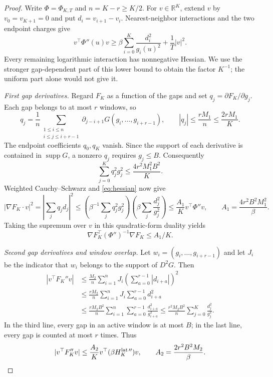 \documentclass[11pt,reqno]{amsart}
\numberwithin{equation}{section}
\theoremstyle{definition}
\theoremstyle{remark}
\newcommand{\R}{\mathbb R}
\newcommand{\1}{\mathbf 1}
\newcommand{\abs}[1]{\left\lvert #1\right\rvert}
\DeclareMathOperator{\supp}{supp}
\begin{document}
\begin{proof}
Write $\Phi=\Phi_{K,T}$ and $n=K-r\ge K/2$. For $v\in\R^K$,
extend $v$ by $v_0=v_{K+1}=0$ and put $d_i=v_{i+1}-v_i$.
Nearest-neighbor interactions and the two endpoint charges give
\begin{equation}\label{eq:hessian}
v^\top\Phi''(u)v
\ge\beta\sum_{i=0}^K\frac{d_i^2}{g_i(u)^2}
   +\frac1T|v|^2.
\end{equation}
Every remaining logarithmic interaction has nonnegative Hessian.
We use the stronger gap-dependent part of this lower bound to obtain
the factor $K^{-1}$; the uniform part alone would not give it.

\smallskip\noindent\textit{First gap derivatives.}
Regard $F_K$ as a function of the gaps and set
$q_j=\partial F_K/\partial g_j$. Each gap belongs to at most $r$
windows, so
\[
q_j=\frac1n\sum_{\substack{1\le i\le n\\i\le j\le i+r-1}}
  \partial_{j-i+1}G(g_i,\ldots,g_{i+r-1}),\qquad
|q_j|\le\frac{rM_1}{n}\le\frac{2rM_1}{K}.
\]
The endpoint coefficients $q_0,q_K$ vanish. Since the support of
each derivative is contained in $\supp G$, a nonzero $q_j$ requires
$g_j\le B$. Consequently
\[
\sum_{j=0}^K q_j^2g_j^2\le\frac{4r^2M_1^2B^2}{K}.
\]
Weighted Cauchy--Schwarz and \eqref{eq:hessian} now give
\[
|\nabla F_K\cdot v|^2
=\abs{\sum_jq_jd_j}^2
\le\left(\beta^{-1}\sum_jq_j^2g_j^2\right)
     \left(\beta\sum_j\frac{d_j^2}{g_j^2}\right)
\le\frac{A_1}{K}v^\top\Phi''v,
\qquad A_1=\frac{4r^2B^2M_1^2}{\beta}.
\]
Taking the supremum over $v$ in this quadratic-form duality yields
\begin{equation}\label{eq:gradient-metric}
\nabla F_K^\top(\Phi'')^{-1}\nabla F_K\le A_1/K.
\end{equation}

\smallskip\noindent\textit{Second gap derivatives and window overlap.}
Let $w_i=(g_i,\ldots,g_{i+r-1})$ and let $J_i$ be the indicator
that $w_i$ belongs to the support of $D^2G$. Then
\[
\begin{split}
|v^\top F_K''v|
&\le\frac{M_2}{n}\sum_{i=1}^n
  J_i\left(\sum_{a=0}^{r-1}|d_{i+a}|\right)^2\\
&\le\frac{rM_2}{n}\sum_{i=1}^nJ_i
  \sum_{a=0}^{r-1}d_{i+a}^2\\
&\le\frac{rM_2B^2}{n}\sum_{i=1}^n
  \sum_{a=0}^{r-1}\frac{d_{i+a}^2}{g_{i+a}^2}
\le\frac{r^2M_2B^2}{n}\sum_{j=0}^K\frac{d_j^2}{g_j^2}.
\end{split}
\]
In the third line, every gap in an active window is at most $B$;
in the last line, every gap is counted at most $r$ times. Thus
\begin{equation}\label{eq:tilt-hessian}
|v^\top F_K''v|
\le\frac{A_2}{K}
 v^\top(\beta H_K^{{\rm lat}\,\prime\prime})v,
\qquad A_2=\frac{2r^2B^2M_2}{\beta}.
\end{equation}


\end{proof}
\end{document}
